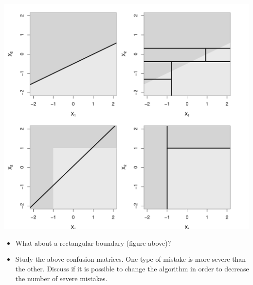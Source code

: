 \documentclass[10pt,ignorenonframetext,]{beamer}
\providecommand{\tightlist}{%
  \setlength{\itemsep}{0pt}\setlength{\parskip}{0pt}}
\begin{document}
\begin{frame}

\includegraphics{Introtostatlearn-326.png}

\end{frame}

\begin{frame}

\begin{itemize}
\tightlist
\item
  What about a rectangular boundary (figure above)?
\item
  Study the above confusion matrices. One type of mistake is more severe
  than the other. Discuss if it is possible to change the algorithm in
  order to decrease the number of severe mistakes.
\end{itemize}

\end{frame}
\end{document}

